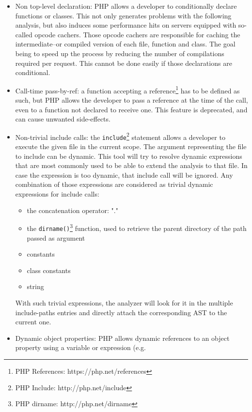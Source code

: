 \documentclass[a4paper]{article}
\begin{document}
\begin{itemize}
  \item Non top-level declaration: PHP allows a developer to conditionally
    declare functions or classes. This not only generates problems with the
    following analysis, but also induces some performance hits on servers equipped
    with so-called opcode cachers. Those opcode cachers are responsible for caching
    the intermediate--or compiled version of each file, function and class. The
    goal being to speed up the process by reducing the number of compilations
    required per request. This cannot be done easily if those declarations are
    conditional.
  \item Call-time pass-by-ref: a function accepting a reference\footnote{PHP
    References: https://php.net/references} has to be defined as such, but PHP
    allows the developer to pass a reference at the time of the call, even to a
    function not declared to receive one. This feature is deprecated, and can cause
    unwanted side-effects.
  \item Non-trivial include calls: the \verb=include=\footnote{PHP Include:
    http://php.net/include} statement allows a developer to execute the given file
    in the current scope. The argument representing the file to include can be
    dynamic. This tool will try to resolve dynamic expressions that are most
    commonly used to be able to extend the analysis to that file. In case the
    expression is too dynamic, that include call will be ignored. Any
    combination of those expressions are considered as trivial dynamic expressions
    for include calls:
    \begin{itemize}
      \item the concatenation operator: "."
      \item the \verb=dirname()=\footnote{PHP dirname: http://php.net/dirname} function,
          used to retrieve the parent directory of the path passed as argument
      \item constants
      \item class constants
      \item string
    \end{itemize}
    With such trivial expressions, the analyzer will look for it in the
    multiple include-paths entries and directly attach the corresponding AST to
    the current one.
  \item Dynamic object properties: PHP allows dynamic references to an object
    property using a variable or expression (e.g. 

\end{itemize}
\end{document}
